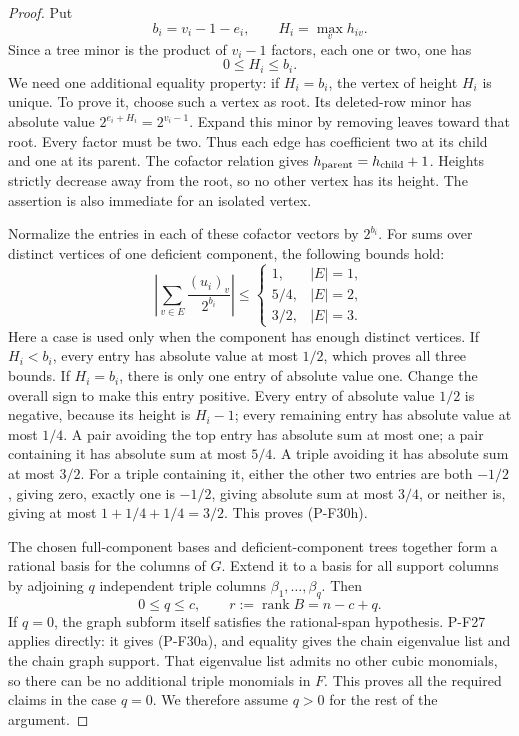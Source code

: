 \documentclass[11pt,a4paper]{article}
\begin{document}
\begin{proof}
Put
\[
 b_i=v_i-1-e_i,\qquad H_i=\max_v h_{iv}.
\]
Since a tree minor is the product of $v_i-1$
factors, each one or two, one has
\[
 0\le H_i\le b_i.
 \tag{P-F30g}
\]
We need one additional equality property: if
$H_i=b_i$, the vertex of height $H_i$ is unique.
To prove it, choose such a vertex as root.
Its deleted-row minor has absolute value
$2^{e_i+H_i}=2^{v_i-1}$. Expand this minor by
removing leaves toward that root. Every factor
must be two. Thus each edge has coefficient
two at its child and one at its parent.
The cofactor relation gives
$h_{\rm parent}=h_{\rm child}+1$.
Heights strictly decrease away from the root,
so no other vertex has its height.
The assertion is also immediate for an isolated vertex.

Normalize the entries in each of these cofactor
vectors by $2^{b_i}$. For sums over distinct
vertices of one deficient component, the following
bounds hold:
\[
 \left|\sum_{v\in E}\frac{(u_i)_v}{2^{b_i}}\right|
 \le
 \begin{cases}
  1,&|E|=1,\\
  5/4,&|E|=2,\\
  3/2,&|E|=3.
 \end{cases}
 \tag{P-F30h}
\]
Here a case is used only when the component has
enough distinct vertices. If $H_i<b_i$, every
entry has absolute value at most $1/2$, which
proves all three bounds. If $H_i=b_i$, there is
only one entry of absolute value one. Change
the overall sign to make this entry positive.
Every entry of absolute value $1/2$ is negative,
because its height is $H_i-1$; every remaining
entry has absolute value at most $1/4$.
A pair avoiding the top entry has absolute sum
at most one; a pair containing it has absolute
sum at most $5/4$. A triple avoiding it has
absolute sum at most $3/2$. For a triple containing
it, either the other two entries are both $-1/2$,
giving zero, exactly one is $-1/2$, giving absolute
sum at most $3/4$, or neither is, giving at most
$1+1/4+1/4=3/2$. This proves (P-F30h).

The chosen full-component bases and deficient-component
trees together form a rational basis for the columns
of $G$. Extend it to a basis for all support columns
by adjoining $q$ independent triple columns
$\beta_1,\ldots,\beta_q$. Then
\[
 0\le q\le c,\qquad
 r:=\operatorname{rank}B=n-c+q.
 \tag{P-F30i}
\]
If $q=0$, the graph subform itself satisfies the
rational-span hypothesis. P-F27 applies directly:
it gives (P-F30a), and equality gives the chain
eigenvalue list and the chain graph support.
That eigenvalue list admits no other cubic
monomials, so there can be no additional triple
monomials in $F$. This proves all the required
claims in the case $q=0$.
We therefore assume $q>0$ for the rest of the argument.


\end{proof}
\end{document}
